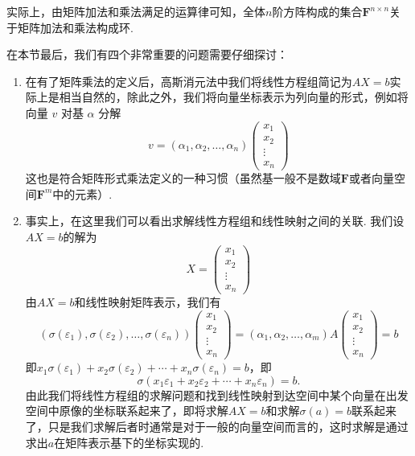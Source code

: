 实际上，由矩阵加法和乘法满足的运算律可知，全体$n$阶方阵构成的集合$\mathbf{F}^{n\times n}$关于矩阵加法和乘法构成环.

在本节最后，我们有四个非常重要的问题需要仔细探讨：
\begin{enumerate}
    \item 在有了矩阵乘法的定义后，高斯消元法中我们将线性方程组简记为$AX=b$实际上是相当自然的，除此之外，我们将向量坐标表示为列向量的形式，例如将向量 $v$ 对基 $\alpha$ 分解
          \[v=(\alpha_1,\alpha_2,\ldots,\alpha_n)\begin{pmatrix}
                  x_1 \\ x_2 \\ \vdots \\ x_n
              \end{pmatrix}\]
          这也是符合矩阵形式乘法定义的一种习惯（虽然基一般不是数域$\mathbf{F}$或者向量空间$\mathbf{F}^m$中的元素）.

    \item 事实上，在这里我们可以看出求解线性方程组和线性映射之间的关联. 我们设$AX=b$的解为
          \[X=\begin{pmatrix}
                  x_1 \\ x_2 \\ \vdots \\ x_n
              \end{pmatrix}\]
          由$AX=b$和线性映射矩阵表示，我们有
          \begin{equation}\label{eq:7:方程组与核空间1}
              (\sigma(\varepsilon_1),\sigma(\varepsilon_2),\ldots,\sigma(\varepsilon_n))\begin{pmatrix}
                  x_1 \\ x_2 \\ \vdots \\ x_n
              \end{pmatrix}=(\alpha_1,\alpha_2,\ldots,\alpha_m)A\begin{pmatrix}
                  x_1 \\ x_2 \\ \vdots \\ x_n
              \end{pmatrix}=b
          \end{equation}
          即$x_1\sigma(\varepsilon_1)+x_2\sigma(\varepsilon_2)+\cdots+x_n\sigma(\varepsilon_n)=b$，即
          \begin{equation}\label{eq:7:方程组与核空间2}
              \sigma(x_1\varepsilon_1+x_2\varepsilon_2+\cdots+x_n\varepsilon_n)=b.
          \end{equation}
          由此我们将线性方程组的求解问题和找到线性映射到达空间中某个向量在出发空间中原像的坐标联系起来了，即将求解$AX=b$和求解$\sigma(a)=b$联系起来了，只是我们求解后者时通常是对于一般的向量空间而言的，这时求解是通过求出$a$在矩阵表示基下的坐标实现的.


\end{enumerate}
